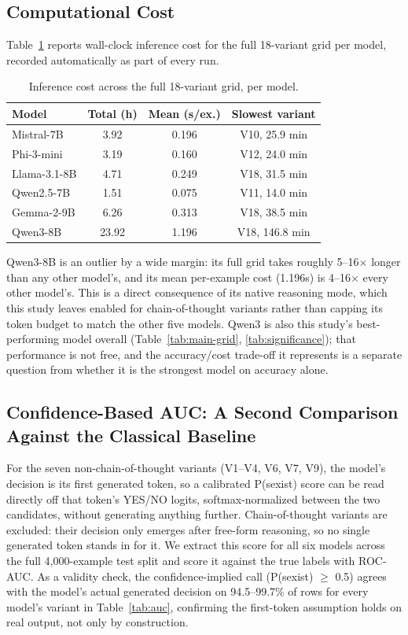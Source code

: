 \subsection{Computational Cost}
\label{sec:results:cost}

Table~\ref{tab:cost} reports wall-clock inference cost for the full
18-variant grid per model, recorded automatically as part of every run.

\begin{table}[t]
\centering
\footnotesize
\caption{Inference cost across the full 18-variant grid, per model.}
\label{tab:cost}
\begin{tabular}{lccc}
\toprule
Model & Total (h) & Mean (s/ex.) & Slowest variant \\
\midrule
Mistral-7B & 3.92 & 0.196 & V10, 25.9 min \\
Phi-3-mini & 3.19 & 0.160 & V12, 24.0 min \\
Llama-3.1-8B & 4.71 & 0.249 & V18, 31.5 min \\
Qwen2.5-7B & 1.51 & 0.075 & V11, 14.0 min \\
Gemma-2-9B & 6.26 & 0.313 & V18, 38.5 min \\
Qwen3-8B & 23.92 & 1.196 & V18, 146.8 min \\
\bottomrule
\end{tabular}
\end{table}

Qwen3-8B is an outlier by a wide margin: its full grid takes roughly
5--16$\times$ longer than any other model's, and its mean per-example
cost (1.196s) is 4--16$\times$ every other model's. This is a direct
consequence of its native reasoning mode, which this study leaves
enabled for chain-of-thought variants rather than capping its token
budget to match the other five models. Qwen3 is also this study's
best-performing model overall (Table~\ref{tab:main-grid},
\ref{tab:significance}); that performance is not free, and the
accuracy/cost trade-off it represents is a separate question from
whether it is the strongest model on accuracy alone.

\subsection{Confidence-Based AUC: A Second Comparison Against the Classical Baseline}
\label{sec:results:auc}

For the seven non-chain-of-thought variants (V1--V4, V6, V7, V9), the
model's decision is its first generated token, so a calibrated
P(sexist) score can be read directly off that token's YES/NO logits,
softmax-normalized between the two candidates, without generating
anything further. Chain-of-thought variants are excluded: their
decision only emerges after free-form reasoning, so no single generated
token stands in for it. We extract this score for all six models across
the full 4,000-example test split and score it against the true labels
with ROC-AUC. As a validity check, the confidence-implied call
(P(sexist) $\geq$ 0.5) agrees with the model's actual generated decision
on 94.5--99.7\% of rows for every model's variant in
Table~\ref{tab:auc}, confirming the first-token assumption holds on
real output, not only by construction.

